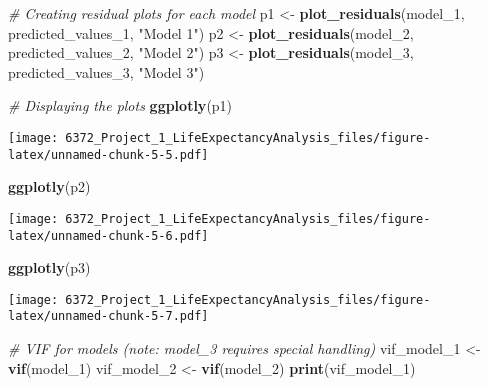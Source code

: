 \documentclass[
]{article}
\newenvironment{Shaded}{\begin{snugshade}}{\end{snugshade}}
\newcommand{\CommentTok}[1]{\textcolor[rgb]{0.56,0.35,0.01}{\textit{#1}}}
\newcommand{\FunctionTok}[1]{\textcolor[rgb]{0.13,0.29,0.53}{\textbf{#1}}}
\newcommand{\NormalTok}[1]{#1}
\newcommand{\OtherTok}[1]{\textcolor[rgb]{0.56,0.35,0.01}{#1}}
\newcommand{\StringTok}[1]{\textcolor[rgb]{0.31,0.60,0.02}{#1}}
\begin{document}
\begin{Shaded}
\begin{Highlighting}[]
\CommentTok{\# Creating residual plots for each model}
\NormalTok{p1 }\OtherTok{\textless{}{-}} \FunctionTok{plot\_residuals}\NormalTok{(model\_1, predicted\_values\_1, }\StringTok{"Model 1"}\NormalTok{)}
\NormalTok{p2 }\OtherTok{\textless{}{-}} \FunctionTok{plot\_residuals}\NormalTok{(model\_2, predicted\_values\_2, }\StringTok{"Model 2"}\NormalTok{)}
\NormalTok{p3 }\OtherTok{\textless{}{-}} \FunctionTok{plot\_residuals}\NormalTok{(model\_3, predicted\_values\_3, }\StringTok{"Model 3"}\NormalTok{)}

\CommentTok{\# Displaying the plots}
\FunctionTok{ggplotly}\NormalTok{(p1)}
\end{Highlighting}
\end{Shaded}

\texttt{[image: 6372\_Project\_1\_LifeExpectancyAnalysis\_files/figure-latex/unnamed-chunk-5-5.pdf]}

\begin{Shaded}
\begin{Highlighting}[]
\FunctionTok{ggplotly}\NormalTok{(p2)}
\end{Highlighting}
\end{Shaded}

\texttt{[image: 6372\_Project\_1\_LifeExpectancyAnalysis\_files/figure-latex/unnamed-chunk-5-6.pdf]}

\begin{Shaded}
\begin{Highlighting}[]
\FunctionTok{ggplotly}\NormalTok{(p3)}
\end{Highlighting}
\end{Shaded}

\texttt{[image: 6372\_Project\_1\_LifeExpectancyAnalysis\_files/figure-latex/unnamed-chunk-5-7.pdf]}

\begin{Shaded}
\begin{Highlighting}[]
\CommentTok{\# VIF for models (note: model\_3 requires special handling)}
\NormalTok{vif\_model\_1 }\OtherTok{\textless{}{-}} \FunctionTok{vif}\NormalTok{(model\_1)}
\NormalTok{vif\_model\_2 }\OtherTok{\textless{}{-}} \FunctionTok{vif}\NormalTok{(model\_2)}
\FunctionTok{print}\NormalTok{(vif\_model\_1)}
\end{Highlighting}
\end{Shaded}
\end{document}
